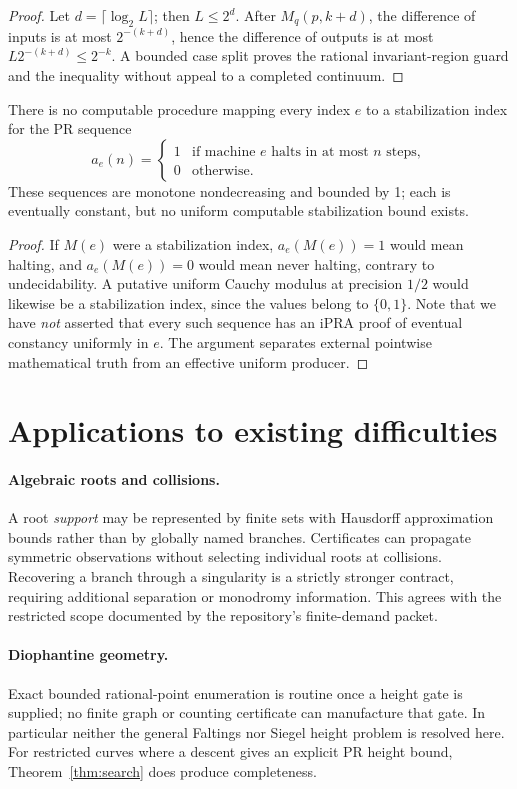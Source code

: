 \documentclass[11pt]{article}
\begin{document}
\begin{proof}Let \(d=\lceil\log_2 L\rceil\); then \(L\le 2^d\). After \(M_q(p,k+d)\), the difference of inputs is at most \(2^{-(k+d)}\), hence the difference of outputs is at most \(L2^{-(k+d)}\le2^{-k}\). A bounded case split proves the rational invariant-region guard and the inequality without appeal to a completed continuum.\end{proof}
\begin{proposition}\label{prop:no-mod}
There is no computable procedure mapping every index \(e\) to a stabilization index for the PR sequence
\[a_e(n)=\begin{cases}1&\text{if machine }e\text{ halts in at most }n\text{ steps},\\0&\text{otherwise}.\end{cases}\]
These sequences are monotone nondecreasing and bounded by 1; each is eventually constant, but no uniform computable stabilization bound exists.
\end{proposition}
\begin{proof}If \(M(e)\) were a stabilization index, \(a_e(M(e))=1\) would mean halting, and \(a_e(M(e))=0\) would mean never halting, contrary to undecidability. A putative uniform Cauchy modulus at precision \(1/2\) would likewise be a stabilization index, since the values belong to \(\{0,1\}\). Note that we have \emph{not} asserted that every such sequence has an iPRA proof of eventual constancy uniformly in \(e\). The argument separates external pointwise mathematical truth from an effective uniform producer.\end{proof}
\section{Applications to existing difficulties}
\paragraph{Algebraic roots and collisions.} A root \emph{support} may be represented by finite sets with Hausdorff approximation bounds rather than by globally named branches. Certificates can propagate symmetric observations without selecting individual roots at collisions. Recovering a branch through a singularity is a strictly stronger contract, requiring additional separation or monodromy information. This agrees with the restricted scope documented by the repository's finite-demand packet.
\paragraph{Diophantine geometry.} Exact bounded rational-point enumeration is routine once a height gate is supplied; no finite graph or counting certificate can manufacture that gate. In particular neither the general Faltings nor Siegel height problem is resolved here. For restricted curves where a descent gives an explicit PR height bound, Theorem~\ref{thm:search} does produce completeness.
\end{document}
